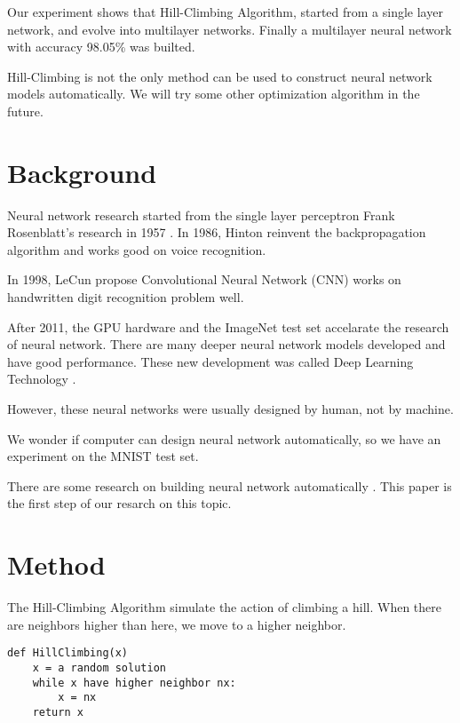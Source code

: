 \documentclass{article}
\begin{document}
Our experiment shows that Hill-Climbing Algorithm, started from a single layer network, and evolve into multilayer networks. Finally a multilayer neural network with accuracy 98.05\% was builted.

Hill-Climbing is not the only method can be used to construct neural network models automatically. We will try some other optimization algorithm in the future.


\section{Background}
Neural network research started from the single layer perceptron Frank Rosenblatt's research in 1957 \cite{Rosenblatt1958ThePA}. In 1986, Hinton reinvent the backpropagation algorithm \cite{Rumelhart1986LearningRB}  and works good on voice recognition. 

In 1998, LeCun \cite{LeCun1998GradientbasedLA} propose Convolutional Neural Network (CNN) works on handwritten digit recognition problem well. 

After 2011, the GPU hardware and the ImageNet test set accelarate the research of neural network. There are many deeper neural network models developed and have good performance. These new development was called Deep Learning Technology \cite{Szegedy2015GoingDW} \cite{Ioffe2015BatchNA} \cite{Chollet2017XceptionDL}.

However, these neural networks were usually designed by human, not by machine.

We wonder if computer can design neural network automatically, so we have an experiment on the MNIST test set.

There are some research on building neural network automatically \cite{Mendoza2019TowardsAD} \cite{Abreu2019AutoNN} . This paper is the first step of our resarch on this topic. 

\section{Method}

The Hill-Climbing Algorithm simulate the action of climbing a hill. When there are neighbors higher than here, we move to a higher neighbor. 

\begin{minipage}{\linewidth}
\begin{lstlisting}
def HillClimbing(x)
    x = a random solution
    while x have higher neighbor nx:
        x = nx
    return x
\end{lstlisting}
\end{minipage}
\end{document}
